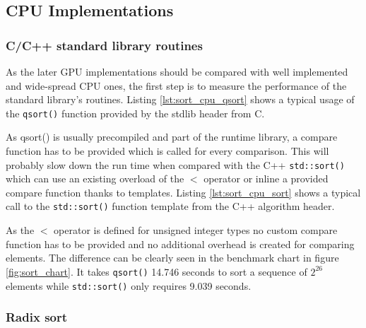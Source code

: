 \subsection{CPU Implementations}

\subsubsection{C/C++ standard library routines}

As the later GPU implementations should be compared with well implemented and wide-spread CPU ones, the first step is to measure the performance of the standard library's routines.
Listing \ref{lst:sort_cpu_qsort} shows a typical usage of the \lstinline|qsort()| function provided by the stdlib header from C.



As qsort() is usually precompiled and part of the runtime library, a compare function has to be provided which is called for every comparison. This will probably slow down the run time when compared with the C++ \lstinline!std::sort()! which can use an existing overload of the $<$ operator or inline a provided compare function thanks to templates.
Listing \ref{lst:sort_cpu_sort} shows a typical call to the \lstinline!std::sort()! function template from the C++ algorithm header.



As the $<$ operator is defined for unsigned integer types no custom compare function has to be provided and no additional overhead is created for comparing elements.
The difference can be clearly seen in the benchmark chart in figure \ref{fig:sort_chart}. It takes \lstinline!qsort()! 14.746 seconds to sort a sequence of $2^{26}$ elements while \lstinline!std::sort()! only requires 9.039 seconds.

\subsubsection{Radix sort}

